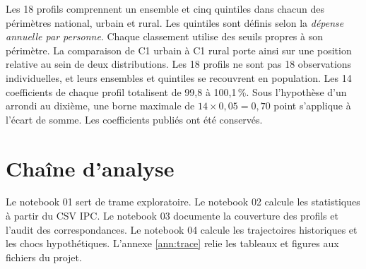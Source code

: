 Les 18 profils comprennent un ensemble et cinq quintiles dans chacun des périmètres national, urbain et rural. Les quintiles sont définis selon la \emph{dépense annuelle par personne}. Chaque classement utilise des seuils propres à son périmètre. La comparaison de C1 urbain à C1 rural porte ainsi sur une position relative au sein de deux distributions. Les 18 profils ne sont pas 18 observations individuelles, et leurs ensembles et quintiles se recouvrent en population. Les 14 coefficients de chaque profil totalisent de 99,8 à 100,1\,\%. Sous l'hypothèse d'un arrondi au dixième, une borne maximale de $14\times0,05=0,70$ point s'applique à l'écart de somme. Les coefficients publiés ont été conservés.

\section{Chaîne d'analyse}
Le notebook 01 sert de trame exploratoire. Le notebook 02 calcule les statistiques à partir du CSV IPC. Le notebook 03 documente la couverture des profils et l'audit des correspondances. Le notebook 04 calcule les trajectoires historiques et les chocs hypothétiques. L'annexe \ref{ann:trace} relie les tableaux et figures aux fichiers du projet.
